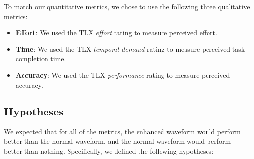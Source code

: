 To match our quantitative metrics, we chose to use the following three qualitative metrics:

\begin{itemize}
  \item \textbf{Effort}:
    We used the TLX \textit{effort} rating to measure perceived effort.
  \item \textbf{Time}:
    We used the TLX \textit{temporal demand} rating to measure perceived task completion time.
  \item \textbf{Accuracy}:
    We used the TLX \textit{performance} rating to measure perceived accuracy.
\end{itemize}


\subsection{Hypotheses}

We expected that for all of the metrics, the enhanced waveform would perform better than the normal waveform, and
the normal waveform would perform better than nothing. Specifically, we defined the following hypotheses:

